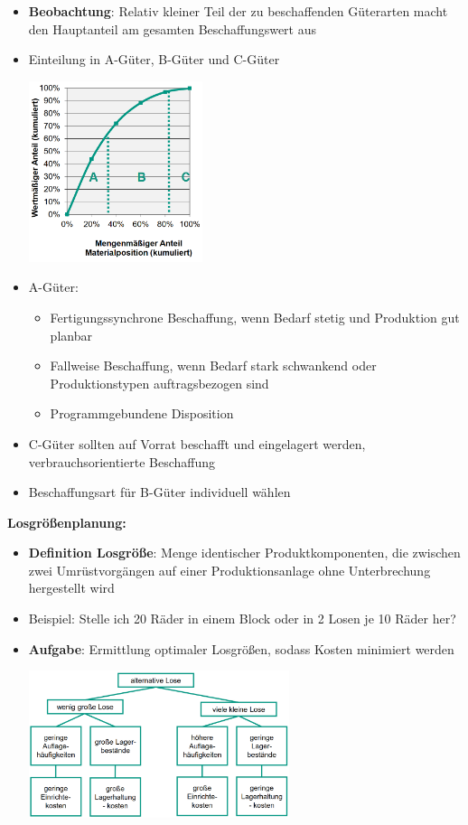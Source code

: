 \begin{itemize}
	\item \textbf{Beobachtung}: Relativ kleiner Teil der zu beschaffenden Güterarten macht den Hauptanteil am gesamten Beschaffungswert aus
	\item Einteilung in A-Güter, B-Güter und C-Güter
	\begin{center}
		\includegraphics[width=0.4\textwidth]{images/abc.png}
	\end{center}
	\item A-Güter: 
	\begin{itemize}
		\item Fertigungssynchrone Beschaffung, wenn Bedarf stetig und Produktion gut planbar
		\item Fallweise Beschaffung, wenn Bedarf stark schwankend oder Produktionstypen auftragsbezogen sind
		\item Programmgebundene Disposition
	\end{itemize}
	\item C-Güter sollten auf Vorrat beschafft und eingelagert werden, verbrauchsorientierte Beschaffung
	\item Beschaffungsart für B-Güter individuell wählen
\end{itemize}
\bigskip
\textbf{Losgrößenplanung:}
\begin{itemize}
	\item \textbf{Definition Losgröße}: Menge identischer Produktkomponenten, die zwischen zwei Umrüstvorgängen auf einer Produktionsanlage ohne Unterbrechung hergestellt wird
	\item Beispiel: Stelle ich 20 Räder in einem Block oder in 2 Losen je 10 Räder her?
	\item \textbf{Aufgabe}: Ermittlung optimaler Losgrößen, sodass Kosten minimiert werden
	\begin{center}
		\includegraphics[width=0.6\textwidth]{images/losgröße.png}
	\end{center}
\end{itemize}

